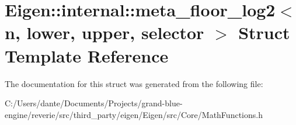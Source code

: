 \hypertarget{struct_eigen_1_1internal_1_1meta__floor__log2}{}\section{Eigen\+::internal\+::meta\+\_\+floor\+\_\+log2$<$ n, lower, upper, selector $>$ Struct Template Reference}
\label{struct_eigen_1_1internal_1_1meta__floor__log2}


The documentation for this struct was generated from the following file\+:\begin{DoxyCompactItemize}
\item 
C\+:/\+Users/dante/\+Documents/\+Projects/grand-\/blue-\/engine/reverie/src/third\+\_\+party/eigen/\+Eigen/src/\+Core/Math\+Functions.\+h\end{DoxyCompactItemize}
